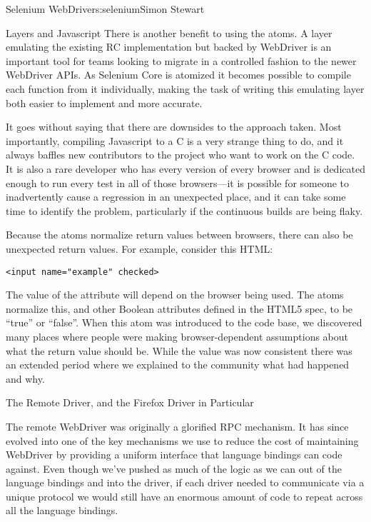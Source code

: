 \begin{aosachapter}{Selenium WebDriver}{s:selenium}{Simon Stewart}
\begin{aosasect1}{Layers and Javascript}
There is another benefit to using the atoms. A layer emulating the
existing RC implementation but backed by WebDriver is an important
tool for teams looking to migrate in a controlled fashion to the newer
WebDriver APIs. As Selenium Core is atomized it becomes possible to
compile each function from it individually, making the task of writing
this emulating layer both easier to implement and more accurate.

It goes without saying that there are downsides to the approach taken.
Most importantly, compiling Javascript to a C  is a very
strange thing to do, and it always baffles new contributors to the
project who want to work on the C code. It is also a rare developer
who has every version of every browser and is dedicated enough to run
every test in all of those browsers---it is possible for someone to
inadvertently cause a regression in an unexpected place, and it can
take some time to identify the problem, particularly if the continuous
builds are being flaky.

Because the atoms normalize return values between browsers, there can
also be unexpected return values. For example, consider this HTML:

\begin{verbatim}
<input name="example" checked>
\end{verbatim}

\noindent The value of the  attribute will depend on the browser
being used. The atoms normalize this, and other Boolean attributes
defined in the HTML5 spec, to be ``true'' or ``false''. When this atom
was introduced to the code base, we discovered many places where
people were making browser-dependent assumptions about what the return
value should be. While the value was now consistent there was an
extended period where we explained to the community what had happened
and why.

\end{aosasect1}

\begin{aosasect1}{The Remote Driver, and the Firefox Driver in Particular}

The remote WebDriver was originally a glorified RPC mechanism. It has
since evolved into one of the key mechanisms we use to reduce the cost
of maintaining WebDriver by providing a uniform interface that
language bindings can code against. Even though we've pushed as much
of the logic as we can out of the language bindings and into the
driver, if each driver needed to communicate via a unique protocol we
would still have an enormous amount of code to repeat across all the
language bindings.


\end{aosasect1}
\end{aosachapter}
